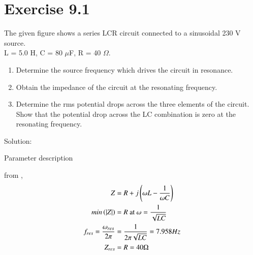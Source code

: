 \documentclass[journal,12pt,twocolumn]{IEEEtran}
\begin{document}


\vspace{3cm}

\title{}
\author{EE23BTECH11217 - Prajwal M$^{*}$
}
\maketitle
\newpage
\bigskip

\renewcommand{\thefigure}{\theenumi}
\renewcommand{\thetable}{\theenumi}

\section*{Exercise 9.1}
The given figure shows a series LCR circuit connected to a sinusoidal 230 V source. \\
L = 5.0 H, C = 80 $\mu$F, R = 40 $\Omega$.

\begin{figure}[h]

\end{figure}

\begin{enumerate}
    \item Determine the source frequency which drives the circuit in resonance.
    \item Obtain the impedance of the circuit
at the resonating frequency.
    \item Determine the rms potential drops across the three elements of
the circuit. Show that the potential drop across the LC
combination is zero at the resonating frequency.\\
\end{enumerate}

Solution:
\begin{table}[h]
    \centering
    
    \caption{Parameter description}
    \label{tab:217.tab.1}
\end{table}
\begin{figure}[h]
	
\end{figure}


from ,
\begin{align}
    Z & = R + j\left(\omega L - \frac{1}{\omega C}\right)\\
    min\left(|Z|\right) & = R \text{ at } \omega = \frac{1}{\sqrt{LC}}\\ 
    f_{res} = \frac{\omega_{res}}{2\pi} & = \frac{1}{2\pi\sqrt{LC}} = 7.958 Hz \label{217.eq.3}\\
    Z_{res} & = R = 40 \Omega\label{217.eq.4}
\end{align}
\end{document}
